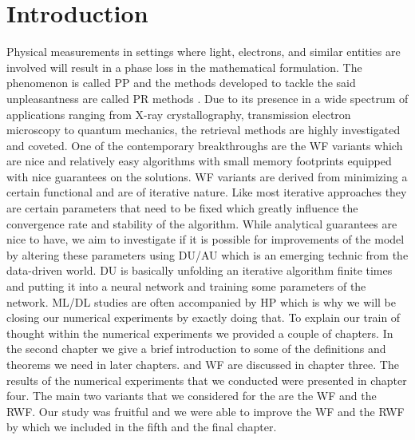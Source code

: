 \chapter{Introduction}

Physical measurements in settings where light, electrons, and similar entities are involved will result in a phase 
loss\cite{Shechtman2015} in the mathematical formulation. The phenomenon is called \acl*{PP}\cite{Shechtman2015} 
and the methods developed to tackle the said unpleasantness are called 
\acl*{PR} methods \cite{Jaganathan2015}\cite{Liu2019}. Due to its presence in a wide spectrum of 
applications\cite{Shechtman2015}\cite{Candes2014} ranging from X-ray crystallography, transmission electron microscopy 
to quantum mechanics, the retrieval methods are highly investigated and coveted. 
One of the contemporary breakthroughs are the \ac{WF}\cite{Candes2014} variants\cite{Liu2019} which are nice and relatively easy algorithms 
with small memory footprints equipped with nice guarantees on the solutions. \ac{WF} variants \cite{Liu2019} are derived 
from minimizing a certain functional and are of iterative nature. Like most iterative approaches they are certain parameters 
that need to be fixed which greatly influence the convergence rate and stability of the algorithm. While analytical guarantees 
are nice to have, we aim to investigate if it is possible for improvements of the model by altering these parameters using \ac{DU}/\ac{AU}\cite{Monga2019}\index{\du}\index{\au} 
which is an emerging technic from the data-driven world. \ac{DU}\index{\du} is basically unfolding an 
iterative algorithm finite times and putting it into a neural network and training some parameters of the network. \ac{ML}/\ac{DL} studies are often accompanied 
by \ac{HP}\cite{Hutter2019}\cite{Akiba2019} which is why we will be closing our numerical experiments by exactly doing that. 
To explain our train of thought within the numerical experiments we provided a couple of chapters. In the 
second chapter we give a brief introduction to some of the definitions and theorems we need in later 
chapters. \DU and \ac{WF} are discussed in chapter three. The results of the numerical experiments that we conducted 
were presented in chapter four. The main two variants that we considered for the \du are the \ac{WF} and the \ac{RWF}. Our 
study was fruitful and we were able to improve the \ac{WF} and the \ac{RWF} by \du which we included in the fifth and the final chapter.